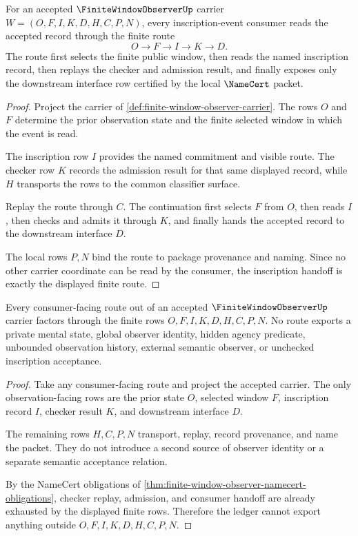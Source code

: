 \begin{theorem}
\label{thm:finite-window-observer-inscription-handoff}
For an accepted $\FiniteWindowObserverUp$ carrier $W=(O,F,I,K,D,H,C,P,N)$, every inscription-event consumer reads the accepted record through the finite route
$$
O \longrightarrow F \longrightarrow I \longrightarrow K \longrightarrow D.
$$
The route first selects the finite public window, then reads the named inscription record, then replays the checker and admission result, and finally exposes only the downstream interface row certified by the local $\NameCert$ packet.
\end{theorem}
\begin{proof}
Project the carrier of \autoref{def:finite-window-observer-carrier}. The rows $O$ and $F$ determine the prior observation state and the finite selected window in which the event is read.

The inscription row $I$ provides the named commitment and visible route. The checker row $K$ records the admission result for that same displayed record, while $H$ transports the rows to the common classifier surface.

Replay the route through $C$. The continuation first selects $F$ from $O$, then reads $I$, then checks and admits it through $K$, and finally hands the accepted record to the downstream interface $D$.

The local rows $P,N$ bind the route to package provenance and naming. Since no other carrier coordinate can be read by the consumer, the inscription handoff is exactly the displayed finite route.
\end{proof}

\begin{theorem}
\label{thm:finite-window-observer-ledger-nonescape}
Every consumer-facing route out of an accepted $\FiniteWindowObserverUp$ carrier factors through the finite rows $O,F,I,K,D,H,C,P,N$. No route exports a private mental state, global observer identity, hidden agency predicate, unbounded observation history, external semantic observer, or unchecked inscription acceptance.
\end{theorem}
\begin{proof}
Take any consumer-facing route and project the accepted carrier. The only observation-facing rows are the prior state $O$, selected window $F$, inscription record $I$, checker result $K$, and downstream interface $D$.

The remaining rows $H,C,P,N$ transport, replay, record provenance, and name the packet. They do not introduce a second source of observer identity or a separate semantic acceptance relation.

By the NameCert obligations of \autoref{thm:finite-window-observer-namecert-obligations}, checker replay, admission, and consumer handoff are already exhausted by the displayed finite rows. Therefore the ledger cannot export anything outside $O,F,I,K,D,H,C,P,N$.
\end{proof}

